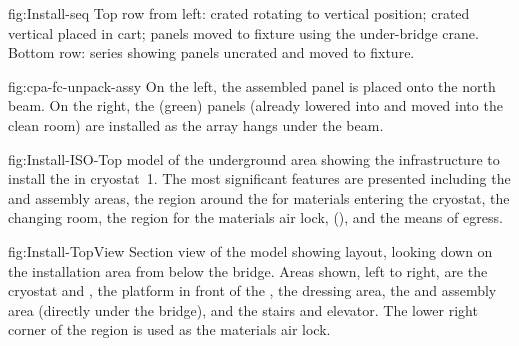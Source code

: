 \begin{dunefigure}{fig:Install-seq}
  {Top row from left:  crated  rotating to vertical position;  crated vertical  placed in cart;  panels moved to fixture using the under-bridge crane. Bottom row: series showing  panels uncrated and moved to fixture. }
\end{dunefigure}

\begin{dunefigure}{fig:cpa-fc-unpack-assy}
  {On the left, the assembled  panel is placed onto the north  beam. On the right, the (green)  panels (already lowered into  and moved into the clean room) are installed as the  array hangs under the  beam. }
\end{dunefigure}

\begin{dunefigure}{fig:Install-ISO-Top}
  {\threed model of the underground area showing the infrastructure to install the  in cryostat~1. The most significant features are presented including the  and  assembly areas, the region around the  for materials entering the cryostat,  the changing room, the region for the materials air lock, (), 
  and the means of egress.}
\end{dunefigure}

\begin{dunefigure}{fig:Install-TopView}
  {Section view of the \threed model showing layout, looking down on the installation area from below the bridge. Areas shown, left to right,  are the cryostat and , the platform in front of the , the dressing area, the  and  assembly area (directly under the bridge), and the stairs and elevator. The lower right corner of the region is used as the materials air lock.}
\end{dunefigure}





